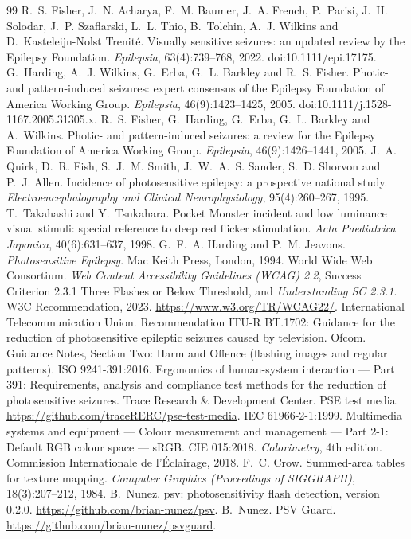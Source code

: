 \documentclass[11pt,a4paper]{article}
\begin{document}
\begin{thebibliography}{99}\small
{} R.~S. Fisher, J.~N. Acharya, F.~M. Baumer, J.~A. French, P.~Parisi, J.~H. Solodar, J.~P. Szaflarski, L.~L. Thio, B.~Tolchin, A.~J. Wilkins and D.~Kasteleijn-Nolst Trenit\'e. Visually sensitive seizures: an updated review by the Epilepsy Foundation. \emph{Epilepsia}, 63(4):739--768, 2022. doi:10.1111/epi.17175.
 G.~Harding, A.~J. Wilkins, G.~Erba, G.~L. Barkley and R.~S. Fisher. Photic- and pattern-induced seizures: expert consensus of the Epilepsy Foundation of America Working Group. \emph{Epilepsia}, 46(9):1423--1425, 2005. doi:10.1111/j.1528-1167.2005.31305.x.
 R.~S. Fisher, G.~Harding, G.~Erba, G.~L. Barkley and A.~Wilkins. Photic- and pattern-induced seizures: a review for the Epilepsy Foundation of America Working Group. \emph{Epilepsia}, 46(9):1426--1441, 2005.
 J.~A. Quirk, D.~R. Fish, S.~J.~M. Smith, J.~W.~A.~S. Sander, S.~D. Shorvon and P.~J. Allen. Incidence of photosensitive epilepsy: a prospective national study. \emph{Electroencephalography and Clinical Neurophysiology}, 95(4):260--267, 1995.
 T.~Takahashi and Y.~Tsukahara. Pocket Monster incident and low luminance visual stimuli: special reference to deep red flicker stimulation. \emph{Acta Paediatrica Japonica}, 40(6):631--637, 1998.
 G.~F.~A. Harding and P.~M. Jeavons. \emph{Photosensitive Epilepsy}. Mac Keith Press, London, 1994.
 World Wide Web Consortium. \emph{Web Content Accessibility Guidelines (WCAG) 2.2}, Success Criterion 2.3.1 Three Flashes or Below Threshold, and \emph{Understanding SC 2.3.1}. W3C Recommendation, 2023. \url{https://www.w3.org/TR/WCAG22/}.
 International Telecommunication Union. Recommendation ITU-R BT.1702: Guidance for the reduction of photosensitive epileptic seizures caused by television.
 Ofcom. Guidance Notes, Section Two: Harm and Offence (flashing images and regular patterns).
 ISO 9241-391:2016. Ergonomics of human-system interaction --- Part 391: Requirements, analysis and compliance test methods for the reduction of photosensitive seizures.
 Trace Research \& Development Center. PSE test media. \url{https://github.com/traceRERC/pse-test-media}.
 IEC 61966-2-1:1999. Multimedia systems and equipment --- Colour measurement and management --- Part 2-1: Default RGB colour space --- sRGB.
 CIE 015:2018. \emph{Colorimetry}, 4th edition. Commission Internationale de l'Éclairage, 2018.
 F.~C. Crow. Summed-area tables for texture mapping. \emph{Computer Graphics (Proceedings of SIGGRAPH)}, 18(3):207--212, 1984.
 B.~Nunez. psv: photosensitivity flash detection, version 0.2.0. \url{https://github.com/brian-nunez/psv}.
 B.~Nunez. PSV Guard. \url{https://github.com/brian-nunez/psvguard}.
\end{thebibliography}
\end{document}
